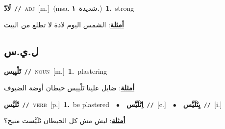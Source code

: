 \documentclass[10pt,a4paper,twoside]{article} %
\begin{document}
\begin{multicols}{2}
{\setlength\topsep{0pt}\textbf{\foreignlanguage{arabic}{لَادّ}}\ {\color{gray}\texttt{//}\color{black}}\ \textsc{adj}\ [m.]\ \color{gray}(msa. \foreignlanguage{arabic}{شديدة}~\foreignlanguage{arabic}{\textbf{١.}})\color{black}\ \textbf{1.}~strong\  \begin{flushright}\color{gray}\foreignlanguage{arabic}{\textbf{\underline{\foreignlanguage{arabic}{أمثلة}}}: الشمس اليوم لادة لا تطلع من البيت}\end{flushright}\color{black}} \vspace{2mm}

\vspace{-3mm}
\subsection*{\color{blue}\foreignlanguage{arabic}{ل.ي.س}\color{blue}{}} 

{\setlength\topsep{0pt}\textbf{\foreignlanguage{arabic}{تَلْيِيس}}\ {\color{gray}\texttt{//}\color{black}}\ \textsc{noun}\ [m.]\ \textbf{1.}~plastering\  \begin{flushright}\color{gray}\foreignlanguage{arabic}{\textbf{\underline{\foreignlanguage{arabic}{أمثلة}}}: ضايل علينا تَلْييس حيطان أوضة الضيوف}\end{flushright}\color{black}} \vspace{2mm}

{\setlength\topsep{0pt}\textbf{\foreignlanguage{arabic}{تْلَيَّس}}\ {\color{gray}\texttt{//}\color{black}}\ \textsc{verb}\ [p.]\ \textbf{1.}~be plastered\ \ $\bullet$\ \ \setlength\topsep{0pt}\textbf{\foreignlanguage{arabic}{اِتْلَيَّس}}\ {\color{gray}\texttt{//}\color{black}}\ [c.]\ \ $\bullet$\ \ \setlength\topsep{0pt}\textbf{\foreignlanguage{arabic}{يِتْلَيَّس}}\ {\color{gray}\texttt{//}\color{black}}\ [i.]\  \begin{flushright}\color{gray}\foreignlanguage{arabic}{\textbf{\underline{\foreignlanguage{arabic}{أمثلة}}}: ليش مش كل الحيطان تْلَيَّست منيح؟}\end{flushright}\color{black}} \vspace{2mm}


\end{multicols}
\end{document}
